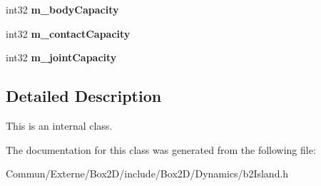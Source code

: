 \begin{DoxyCompactItemize}
\item 
int32 {\bfseries m\+\_\+body\+Capacity}\hypertarget{classb2_island_a5ea371889bb93fb6387ff2ab427191ed}{}\label{classb2_island_a5ea371889bb93fb6387ff2ab427191ed}

\item 
int32 {\bfseries m\+\_\+contact\+Capacity}\hypertarget{classb2_island_a1a65b8fc8256ca443f85e6ae6f2d841a}{}\label{classb2_island_a1a65b8fc8256ca443f85e6ae6f2d841a}

\item 
int32 {\bfseries m\+\_\+joint\+Capacity}\hypertarget{classb2_island_a9b6e63c89307d469e1075585d65a9bbb}{}\label{classb2_island_a9b6e63c89307d469e1075585d65a9bbb}

\end{DoxyCompactItemize}


\subsection{Detailed Description}
This is an internal class. 

The documentation for this class was generated from the following file\+:\begin{DoxyCompactItemize}
\item 
Commun/\+Externe/\+Box2\+D/include/\+Box2\+D/\+Dynamics/b2\+Island.\+h\end{DoxyCompactItemize}
